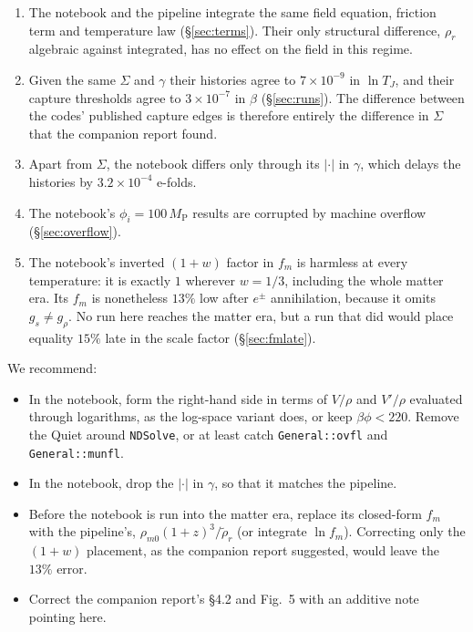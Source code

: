 \documentclass[11pt,a4paper]{article}
\newcommand{\MP}{M_{\mathrm{P}}}
\newcommand{\TJ}{T_{J}}
\newcommand{\code}[1]{\texttt{#1}}
\begin{document}
\begin{enumerate}
\item The notebook and the pipeline integrate the same field equation, friction term and
  temperature law (\S\ref{sec:terms}). Their only structural difference, $\rho_r$ algebraic
  against integrated, has no effect on the field in this regime.
\item Given the same $\Sigma$ and $\gamma$ their histories agree to $7\times10^{-9}$ in
  $\ln\TJ$, and their capture thresholds agree to $3\times10^{-7}$ in $\beta$ (\S\ref{sec:runs}). The difference between
  the codes' published capture edges is therefore entirely the difference in $\Sigma$ that the
  companion report found.
\item Apart from $\Sigma$, the notebook differs only through its $|\cdot|$ in $\gamma$, which
  delays the histories by $3.2\times10^{-4}$ e-folds.
\item The notebook's $\phi_i = 100\,\MP$ results are corrupted by machine overflow
  (\S\ref{sec:overflow}).
\item The notebook's inverted $(1+w)$ factor in $f_m$ is harmless at every temperature: it is
  exactly $1$ wherever $w = 1/3$, including the whole matter era. Its $f_m$ is nonetheless $13\%$
  low after $e^\pm$ annihilation, because it omits $g_s \ne g_\rho$. No run here reaches the
  matter era, but a run that did would place equality $15\%$ late in the scale factor
  (\S\ref{sec:fmlate}).
\end{enumerate}

\noindent We recommend:
\begin{itemize}
\item In the notebook, form the right-hand side in terms of $V/\rho$ and $V'/\rho$ evaluated
  through logarithms, as the log-space variant does, or keep $\beta\phi < 220$. Remove the Quiet
  around \code{NDSolve}, or at least catch \code{General::ovfl} and \code{General::munfl}.
\item In the notebook, drop the $|\cdot|$ in $\gamma$, so that it matches the pipeline.
\item Before the notebook is run into the matter era, replace its closed-form $f_m$ with the
  pipeline's, $\rho_{m0}(1+z)^3/\tilde\rho_r$ (or integrate $\ln f_m$). Correcting only the $(1+w)$
  placement, as the companion report suggested, would leave the $13\%$ error.
\item Correct the companion report's \S4.2 and Fig.~5 with an additive note pointing here.
\end{itemize}
\end{document}
